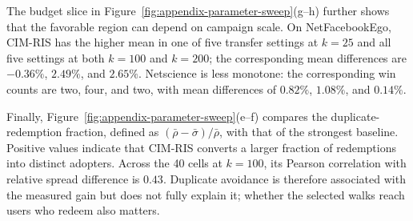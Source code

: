 \documentclass[sigconf,balance=false]{acmart}
\newcommand{\CIMRIS}{\textsc{CIM-RIS}}
\begin{document}
The budget slice in Figure~\ref{fig:appendix-parameter-sweep}(g--h) further
shows that the favorable region can depend on campaign scale. On
NetFacebookEgo, \CIMRIS{} has the higher mean in one of five transfer settings
at $k=25$ and all five settings at both $k=100$ and $k=200$; the corresponding
mean differences are $-0.36\%$, $2.49\%$, and $2.65\%$. Netscience is less
monotone: the corresponding win counts are two, four, and two, with mean
differences of $0.82\%$, $1.08\%$, and $0.14\%$.

Finally, Figure~\ref{fig:appendix-parameter-sweep}(e--f) compares the
duplicate-redemption fraction, defined as
$(\bar\rho-\bar\sigma)/\bar\rho$, with that of the strongest baseline.
Positive values indicate that \CIMRIS{} converts a larger fraction of
redemptions into distinct adopters. Across the 40 cells at $k=100$, its
Pearson correlation with relative spread difference is $0.43$. Duplicate
avoidance is therefore associated with the measured gain but does not fully
explain it; whether the selected walks reach users who redeem also matters.
\FloatBarrier
\balance



\end{document}
